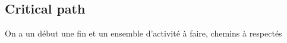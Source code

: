 \subsection{Critical path}
On a un début une fin et un ensemble d'activité à faire, chemins à respectés



































